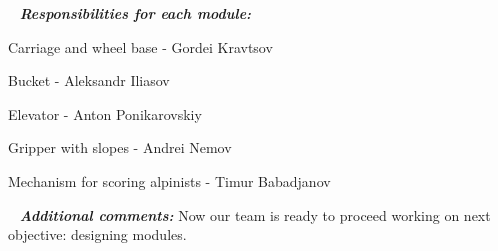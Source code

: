    \newline
  \textit{\textbf{Responsibilities for each module:}}
  \begin{enumerate*}
  	\item Carriage and wheel base - Gordei Kravtsov
  	
  	\item Bucket - Aleksandr Iliasov
  	
  	\item Elevator - Anton Ponikarovskiy
  	
  	\item Gripper with slopes - Andrei Nemov
  	
  	\item Mechanism for scoring alpinists - Timur Babadjanov
  \end{enumerate*}
  
   \newline
  \textit{\textbf{Additional comments:}} Now our team is ready to proceed working on next objective: designing modules.

\fillpage
